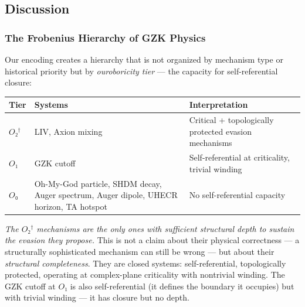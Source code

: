 \documentclass[12pt,a4paper]{article}
\begin{document}
\subsection{Discussion}

\subsubsection{The Frobenius Hierarchy of GZK Physics}

Our encoding creates a hierarchy that is not organized by mechanism type or historical priority but by \emph{ouroboricity tier} --- the capacity for self-referential closure:

\begin{table}[htbp]
\centering
\small
{}
\begin{tabularx}{\textwidth}{>{\centering\arraybackslash}X >{\centering\arraybackslash}X >{\centering\arraybackslash}X}
\toprule
\rowcolor{gray!25}\textbf{Tier} & \textbf{Systems} & \textbf{Interpretation} \\
\midrule
\rowcolors{1}{white}{gray!10}
$O₂^\dagger$ & LIV, Axion mixing & Critical + topologically protected evasion mechanisms \\
$O₁$ & GZK cutoff & Self-referential at criticality, trivial winding \\
$O₀$ & Oh-My-God particle, SHDM decay, Auger spectrum, Auger dipole, UHECR horizon, TA hotspot & No self-referential capacity \\
\bottomrule
\end{tabularx}
\end{table}

\emph{The $O₂^\dagger$ mechanisms are the only ones with sufficient structural depth to sustain the evasion they propose.} This is not a claim about their physical correctness --- a structurally sophisticated mechanism can still be wrong --- but about their \emph{structural completeness}. They are closed systems: self-referential, topologically protected, operating at complex-plane criticality with nontrivial winding. The GZK cutoff at $O₁$ is also self-referential (it defines the boundary it occupies) but with trivial winding --- it has closure but no depth.
\end{document}
